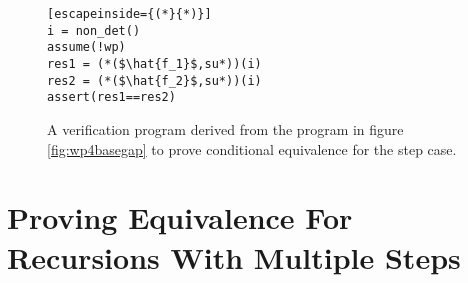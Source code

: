 \begin{figure} [h]
\begin{center}
\begin{minipage}{7 cm}
\begin{lstlisting}[escapeinside={(*}{*)}]
i = non_det()
assume(!wp)
res1 = (*($\hat{f_1}$,su*))(i)
res2 = (*($\hat{f_2}$,su*))(i)
assert(res1==res2)
\end{lstlisting}
\end{minipage}
\caption{A verification program derived from the program in figure \ref{fig:wp4basegap} to prove conditional equivalence for the step case.}
\label{fig:stepvefprogram}
\end{center}
\end{figure}

\section{Proving Equivalence For Recursions With Multiple Steps}
\label{sec:multistep}

